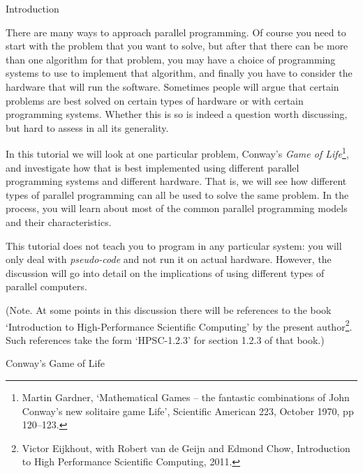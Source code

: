  {Introduction}

There are many ways to approach parallel programming. 
Of course you need to start with the problem that you want to solve,
but after that there can be more than one algorithm for that problem,
you may have a choice of programming systems to use
to implement that algorithm, and finally 
you have to consider the hardware that will run 
the software. Sometimes people will argue that certain problems are best solved
on certain types of hardware or with certain programming systems.
Whether this is so is indeed a question worth discussing, but 
hard to assess in all its generality.

In this tutorial we will look at one particular problem, Conway's
\emph{Game of Life}\footnote{Martin Gardner, `Mathematical Games --
  the fantastic combinations of John Conway's new solitaire game
  Life', Scientific American 223, October 1970, pp 120--123.}, and
investigate how that is best implemented using different parallel
programming systems and different hardware. That is, we will see how
different types of parallel programming can all be used to solve the
same problem.  In the process, you will learn about most of the common
parallel programming models and their characteristics.

This tutorial does not teach you to program in any particular
system: you  will only deal with \emph{pseudo-code}
and not run it on actual hardware. However, the discussion
will go into detail on the implications of using different
types of parallel computers.

(Note. At some points in this discussion there will be references to
the book `Introduction to High-Performance Scientific Computing' by
the present author\footnote
{Victor Eijkhout, with Robert van de Geijn and Edmond Chow,
  Introduction to High Performance Scientific Computing, 2011.}. Such
references take the form `HPSC-1.2.3' for section 1.2.3 of that book.)

 {Conway's Game of Life}

